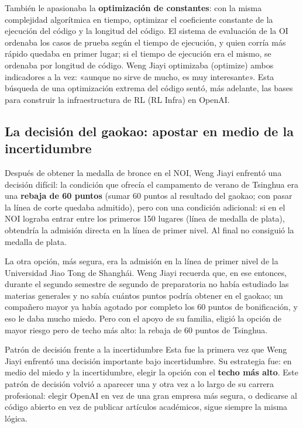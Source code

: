 También le apasionaba la \textbf{optimización de constantes}: con la misma complejidad algorítmica en tiempo, optimizar el coeficiente constante de la ejecución del código y la longitud del código. El sistema de evaluación de la OI ordenaba los casos de prueba según el tiempo de ejecución, y quien corría más rápido quedaba en primer lugar; si el tiempo de ejecución era el mismo, se ordenaba por longitud de código. Weng Jiayi optimizaba (optimize) ambos indicadores a la vez: «aunque no sirve de mucho, es muy interesante». Esta búsqueda de una optimización extrema del código sentó, más adelante, las bases para construir la infraestructura de RL (RL Infra) en OpenAI.

\subsection{La decisión del gaokao: apostar en medio de la incertidumbre}

Después de obtener la medalla de bronce en el NOI, Weng Jiayi enfrentó una decisión difícil: la condición que ofrecía el campamento de verano de Tsinghua era una \textbf{rebaja de 60 puntos} (sumar 60 puntos al resultado del gaokao; con pasar la línea de corte quedaba admitido), pero con una condición adicional: si en el NOI lograba entrar entre los primeros 150 lugares (línea de medalla de plata), obtendría la admisión directa en la línea de primer nivel. Al final no consiguió la medalla de plata.

La otra opción, más segura, era la admisión en la línea de primer nivel de la Universidad Jiao Tong de Shanghái. Weng Jiayi recuerda que, en ese entonces, durante el segundo semestre de segundo de preparatoria no había estudiado las materias generales y no sabía cuántos puntos podría obtener en el gaokao; un compañero mayor ya había agotado por completo los 60 puntos de bonificación, y eso le daba mucho miedo. Pero con el apoyo de su familia, eligió la opción de mayor riesgo pero de techo más alto: la rebaja de 60 puntos de Tsinghua.

\begin{warningbox}{Patrón de decisión frente a la incertidumbre}
Esta fue la primera vez que Weng Jiayi enfrentó una decisión importante bajo incertidumbre. Su estrategia fue: en medio del miedo y la incertidumbre, elegir la opción con el \textbf{techo más alto}. Este patrón de decisión volvió a aparecer una y otra vez a lo largo de su carrera profesional: elegir OpenAI en vez de una gran empresa más segura, o dedicarse al código abierto en vez de publicar artículos académicos, sigue siempre la misma lógica.
\end{warningbox}

